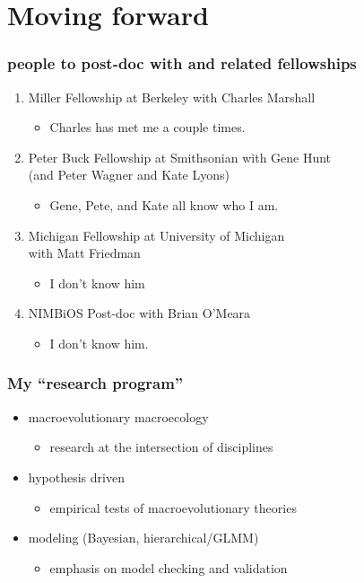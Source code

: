 \documentclass{beamer}
\begin{document}
\section{Moving forward}

\begin{frame}
  \frametitle{people to post-doc with and related fellowships}
  \begin{enumerate}
    \item Miller Fellowship at Berkeley with Charles Marshall
      \begin{itemize}
        \item Charles has met me a couple times.
      \end{itemize}
    \item Peter Buck Fellowship at Smithsonian with Gene Hunt \\(and Peter Wagner and Kate Lyons)
      \begin{itemize}
        \item Gene, Pete, and Kate all know who I am.
      \end{itemize}
    \item Michigan Fellowship at University of Michigan \\with Matt Friedman
      \begin{itemize}
        \item I don't know him
      \end{itemize}
    \item NIMBiOS Post-doc with Brian O'Meara
      \begin{itemize}
        \item I don't know him.
      \end{itemize}
  \end{enumerate}
\end{frame}

\begin{frame}
  \frametitle{My ``research program''}
  \begin{itemize}
    \item macroevolutionary macroecology
      \begin{itemize}
        \item research at the intersection of disciplines
      \end{itemize}
    \item hypothesis driven
      \begin{itemize}
        \item empirical tests of macroevolutionary theories
      \end{itemize}
    \item modeling (Bayesian, hierarchical/GLMM)
      \begin{itemize}
        \item emphasis on model checking and validation
      \end{itemize}
  \end{itemize}
\end{frame}
\end{document}
